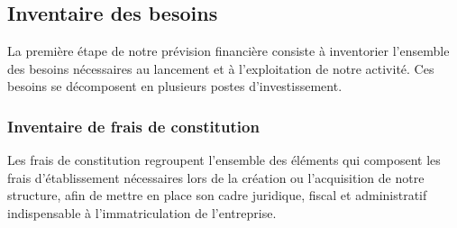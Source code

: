 
\subsection{Inventaire des besoins}
La première étape de notre prévision financière consiste à inventorier l’ensemble des besoins nécessaires au lancement et à l’exploitation de notre activité. Ces besoins se décomposent en plusieurs postes d’investissement.

\subsubsection{Inventaire de frais de constitution}
Les frais de constitution regroupent l’ensemble des éléments qui composent les frais d’établissement nécessaires lors de la création ou l’acquisition de notre structure, afin de mettre en place son cadre juridique, fiscal et administratif indispensable à l’immatriculation de l’entreprise.

